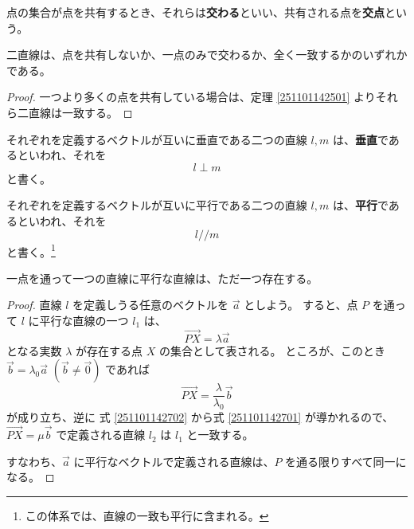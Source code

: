 \begin{dfn}[交わる、交点]
  点の集合が点を共有するとき、それらは\textbf{交わる}といい、共有される点を\textbf{交点}という。
\end{dfn}

\begin{thm}
  二直線は、点を共有しないか、一点のみで交わるか、全く一致するかのいずれかである。
\end{thm}

\begin{proof}
  一つより多くの点を共有している場合は、定理 \ref{251101142501} よりそれら二直線は一致する。
\end{proof}

\begin{dfn}[直線の垂直]
  それぞれを定義するベクトルが互いに垂直である二つの直線 \(l,m\) は、\textbf{垂直}であるといわれ、それを
  \[l\perp m\]
  と書く。
\end{dfn}

\begin{dfn}[直線の平行]
  それぞれを定義するベクトルが互いに平行である二つの直線 \(l,m\) は、\textbf{平行}であるといわれ、それを
  \[l/\!/m\]
  と書く。\footnote{この体系では、直線の一致も平行に含まれる。}
\end{dfn}

\begin{thm}
  一点を通って一つの直線に平行な直線は、ただ一つ存在する。
\end{thm}

\begin{proof}
  直線 \(l\) を定義しうる任意のベクトルを \(\vec{a}\) としよう。
  すると、点 \(P\) を通って \(l\) に平行な直線の一つ \(l_1\) は、
  \begin{equation}\label{251101142701}
    \overrightarrow{PX}=\lambda\vec{a}
  \end{equation}
  となる実数 \(\lambda\) が存在する点 \(X\) の集合として表される。
  ところが、このとき \(\vec{b}=\lambda_0\vec{a}\) \((\vec{b}\neq\vec{0})\) であれば
  \begin{equation}\label{251101142702}
    \overrightarrow{PX}=\frac{\lambda}{\lambda_0}\vec{b}
  \end{equation}
  が成り立ち、逆に
  式 \eqref{251101142702} から式 \eqref{251101142701} が導かれるので、\(\overrightarrow{PX}=\mu\vec{b}\) で定義される直線 \(l_2\) は \(l_1\) と一致する。

  すなわち、\(\vec{a}\) に平行なベクトルで定義される直線は、\(P\) を通る限りすべて同一になる。
\end{proof}

